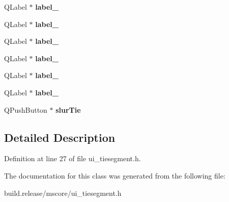 \begin{DoxyCompactItemize}
\mbox{\label{class_ui___tie_segment_a3eaeec99581d4fe3a4badd6551d8ac33}} 
Q\+Label $\ast$ {\bfseries label\+\_}
\item 
\mbox{\label{class_ui___tie_segment_a42f07b372df180dc92d2f2a7569c6ac1}} 
Q\+Label $\ast$ {\bfseries label\+\_}
\item 
\mbox{\label{class_ui___tie_segment_a2ad9302aeb28c0e744c179c9810ce09a}} 
Q\+Label $\ast$ {\bfseries label\+\_}
\item 
\mbox{\label{class_ui___tie_segment_a106cd83e51939eb5076ebbe21c6edd47}} 
Q\+Label $\ast$ {\bfseries label\+\_}
\item 
\mbox{\label{class_ui___tie_segment_ac600627f3e1c9bf6c4d5e0ab61ed0643}} 
Q\+Label $\ast$ {\bfseries label\+\_}
\item 
\mbox{\label{class_ui___tie_segment_a06821333e7afe02e2b1b1bebc2823235}} 
Q\+Label $\ast$ {\bfseries label\+\_}
\item 
\mbox{\label{class_ui___tie_segment_aee4148e17a31f6782cb98fd53bc836b6}} 
Q\+Push\+Button $\ast$ {\bfseries slur\+Tie}
\end{DoxyCompactItemize}


\subsection{Detailed Description}


Definition at line 27 of file ui\+\_\+tiesegment.\+h.



The documentation for this class was generated from the following file\+:\begin{DoxyCompactItemize}
\item 
build.\+release/mscore/ui\+\_\+tiesegment.\+h\end{DoxyCompactItemize}
